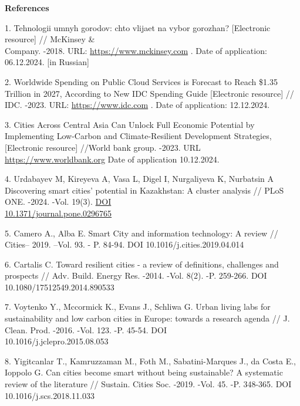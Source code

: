 \begin{center}
{\bfseries References}
\end{center}

\begin{references}
1. Tehnologii umnyh gorodov: chto vlijaet na vybor gorozhan?
{[}Electronic resource{]} // McKinsey \& \\Company. -2018. URL:
\href{https://www.mckinsey.com/industries/public-sector/our-insights/smart-city-solutions-what-drives-citizen-adoption-around-the-globe/ru-RU}{https://www.mckinsey.com} . Date
of application: 06.12.2024. {[}in Russian{]}

2. Worldwide Spending on Public Cloud Services is Forecast to Reach
\$1.35 Trillion in 2027, According to New IDC Spending Guide
{[}Electronic resource{]} // IDC. -2023. URL:
\href{https://www.idc.com/getdoc.jsp?containerId=prUS51179523}{https://www.idc.com} . Date
of application: 12.12.2024.

3. Cities Across Central Asia Can Unlock Full Economic Potential by
Implementing Low-Carbon and Climate-Resilient Development Strategies,
{[}Electronic resource{]} //World bank group. -2023. URL\\
\href{https://www.worldbank.org/en/news/press-release/2023/09/27/cities-across-central-asia-can-unlock-full-economic-potential-by-implementing-low-carbon-development-strategies}{https://www.worldbank.org}
Date of application 10.12.2024.

4. Urdabayev M, Kireyeva A, Vasa L, Digel I, Nurgaliyeva K, Nurbatsin A
Discovering smart cities' potential in Kazakhstan: A cluster analysis
// PLoS ONE. -2024. -Vol. 19(3).
\href{https://doi.org/10.1371/journal.pone.0296765}{DOI\\
10.1371/journal.pone.0296765}

5. Camero A., Alba E. Smart City and information technology: A review //
Cities-- 2019. --Vol. 93. - P. 84-94. DOI 10.1016/j.cities.2019.04.014

6. Cartalis C. Toward resilient cities - a review of definitions,
challenges and prospects // Adv. Build. Energy Res. -2014. -Vol. 8(2).
-P. 259-266. DOI 10.1080/17512549.2014.890533

7. Voytenko Y., Mccormick K., Evans J., Schliwa G. Urban living labs for
sustainability and low carbon cities in Europe: towards a research
agenda // J. Clean. Prod. -2016. -Vol. 123. -P. 45-54. DOI\\
10.1016/j.jclepro.2015.08.053

8. Yigitcanlar T., Kamruzzaman M., Foth M., Sabatini-Marques J., da Costa
E., Ioppolo G. Can cities become smart without being sustainable? A
systematic review of the literature // Sustain. Cities Soc. -2019.
-Vol. 45. -P. 348-365. DOI 10.1016/j.scs.2018.11.033


\end{references}

